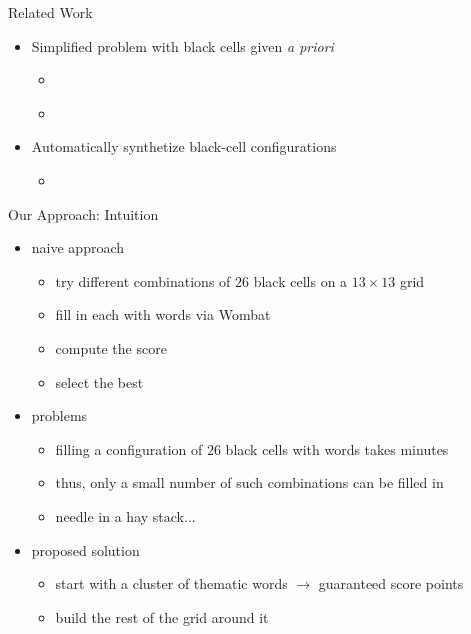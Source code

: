\documentclass[aspectratio=169,usenames,dvipsnames]{beamer}
\newcommand{\tcb}[1]{\textcolor{m1}{#1}}
\newcommand{\tcg}[1]{\textcolor{m5}{#1}}
\newcommand{\tcm}[1]{\textcolor{m7}{#1}}
\newcommand{\bei}{\begin{itemize}}
\newcommand{\eei}{\end{itemize}}
\newcommand{\ie}{\item}
\numberwithin{equation}{section}
\numberwithin{theorem}{section}
\numberwithin{lem}{section}
\numberwithin{df}{section}
\begin{document}

\begin{frame}{Related Work}

\bei

\ie Simplified problem with black cells given \emph{a priori} 
\bei
\ie \cite{DBLP:conf/socs/BoteaB21}
\ie \cite{Botea_Bulitko_2022}
\eei

\bigskip

\ie Automatically synthetize black-cell configurations
\bei
\ie \cite{DBLP:conf/cig/BulitkoB21}
\eei
\eei

\end{frame}


\begin{frame}{Our Approach: Intuition}

\bei

\ie \tcb{naive approach} 
\bei 
\ie try different combinations of $26$ black cells on a $13 \times 13$ grid
\ie fill in each with words via {\sc Wombat}
\ie compute the score
\ie select the best
\eei

\bigskip

\ie \tcm{problems}
\bei
\ie filling a configuration of $26$ black cells with words takes minutes
\ie thus, only a small number of such combinations can be filled in
\ie needle in a hay stack...
\eei

\bigskip

\ie \tcg{proposed solution}
\bei
\ie start with a cluster of thematic words $\to$ guaranteed score points
\ie build the rest of the grid around it
\eei

\eei

\end{frame}




\end{document}

